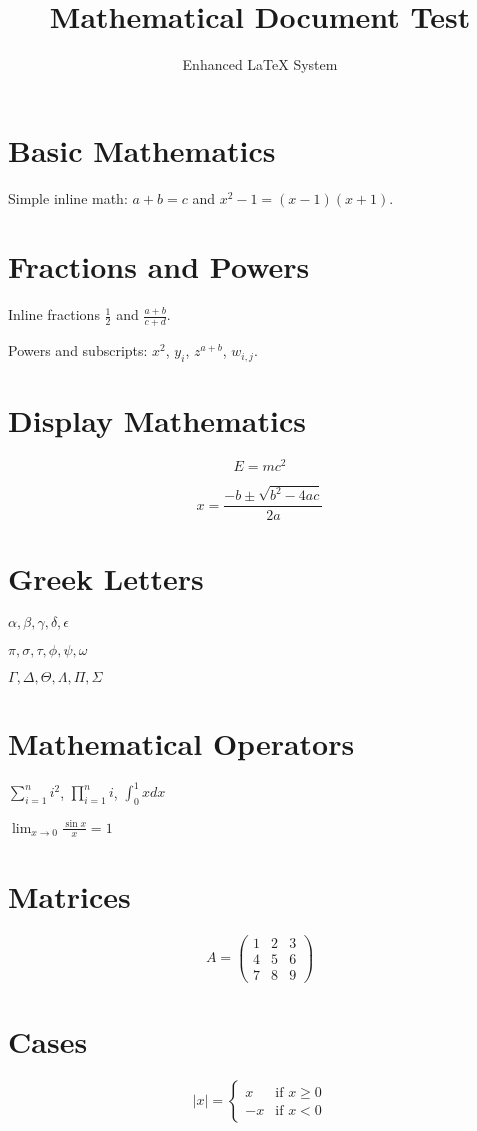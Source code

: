 \documentclass[12pt]{article}
\title{Mathematical Document Test}
\author{Enhanced LaTeX System}
\begin{document}
\maketitle

\section{Basic Mathematics}

Simple inline math: $a + b = c$ and $x^2 - 1 = (x-1)(x+1)$.

\section{Fractions and Powers}

Inline fractions $\frac{1}{2}$ and $\frac{a+b}{c+d}$.

Powers and subscripts: $x^2$, $y_i$, $z^{a+b}$, $w_{i,j}$.

\section{Display Mathematics}

\begin{equation}
E = mc^2
\end{equation}

\begin{equation}
x = \frac{-b \pm \sqrt{b^2 - 4ac}}{2a}
\end{equation}

\section{Greek Letters}

$\alpha, \beta, \gamma, \delta, \epsilon$

$\pi, \sigma, \tau, \phi, \psi, \omega$

$\Gamma, \Delta, \Theta, \Lambda, \Pi, \Sigma$

\section{Mathematical Operators}

$\sum_{i=1}^n i^2$, $\prod_{i=1}^n i$, $\int_0^1 x dx$

$\lim_{x \to 0} \frac{\sin x}{x} = 1$

\section{Matrices}

\begin{equation}
A = \begin{pmatrix}
1 & 2 & 3 \\
4 & 5 & 6 \\
7 & 8 & 9
\end{pmatrix}
\end{equation}

\section{Cases}

\begin{equation}
|x| = \begin{cases}
x & \text{if } x \geq 0 \\
-x & \text{if } x < 0
\end{cases}
\end{equation}
\end{document}
